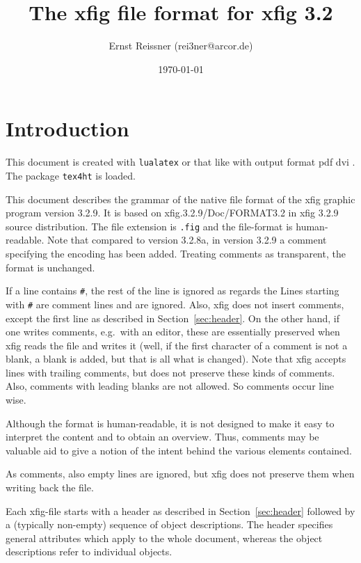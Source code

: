 \documentclass[10pt, a4paper]{article}%
\title{The xfig file format for xfig 3.2 }
\author{Ernst Reissner (rei3ner@arcor.de)}
\date{\today}
\begin{document}
\maketitle
\tableofcontents

\section{Introduction}

This document is created with \texttt{lualatex} or that like 
with output format 
\ifpdf%
pdf%
\else
dvi%
\fi.
The package \texttt{tex4ht} 
is  loaded. 

This document describes the grammar 
of the native file format of the xfig graphic program version 3.2.9. 
It is based on xfig.3.2.9/Doc/FORMAT3.2 in xfig 3.2.9 source distribution. 
The file extension is \texttt{.fig} and the file-format is human-readable. 
Note that compared to version 3.2.8a, in version 3.2.9 
a comment specifying the encoding has been added. 
Treating comments as transparent, the format is unchanged. 

If a line contains \texttt{\#}, 
the rest of the line is ignored as regards the 
Lines starting with \texttt{\#} are comment lines and are ignored. 
Also, xfig does not insert comments, 
except the first line as described in Section~\ref{sec:header}. 
On the other hand, if one writes comments, e.g.~with an editor, 
these are essentially preserved when xfig reads the file and writes it 
(well, if the first character of a comment is not a blank, 
a blank is added, but that is all what is changed). 
Note that xfig accepts lines with trailing comments, 
but does not preserve these kinds of comments. 
Also, comments with leading blanks are not allowed. 
So comments occur line wise. 

Although the format is human-readable, 
it is not designed to make it easy to interpret the content 
and to obtain an overview. 
Thus, comments may be valuable aid to give a notion 
of the intent behind the various elements contained. 

As comments, also empty lines are ignored, 
but xfig does not preserve them when writing back the file. 

Each xfig-file starts with a header as described in Section~\ref{sec:header} 
followed by a (typically non-empty) sequence of object descriptions. 
The header specifies general attributes which apply to the whole document, 
whereas the object descriptions refer to individual objects. 
\end{document}
